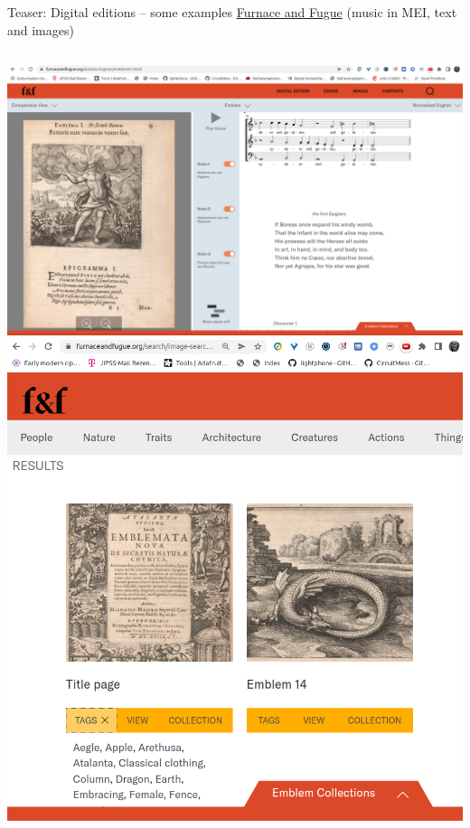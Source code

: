 \begin{frame}[allowframebreaks]{Teaser: Digital editions -- some examples}
    \href{https://furnaceandfugue.org}{Furnace and Fugue} (music in MEI, text and images)
    \begin{columns}
    \includegraphics[width=\textwidth]{img/fnf1.png}
    \includegraphics[width=\textwidth]{img/fnf2.png}
    \end{columns}
    
    
\end{frame}


